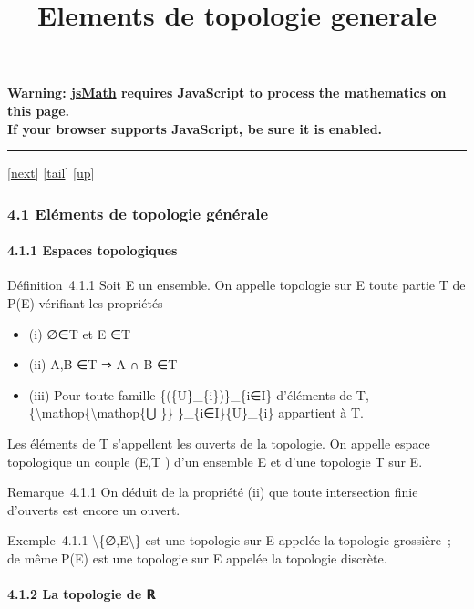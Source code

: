 \documentclass[]{article}
\title{Elements de topologie generale}
\author{}
\date{}
\begin{document}
\maketitle

\textbf{Warning: \href{http://www.math.union.edu/locate/jsMath}{jsMath}
requires JavaScript to process the mathematics on this page.\\ If your
browser supports JavaScript, be sure it is enabled.}

\begin{center}\rule{3in}{0.4pt}\end{center}

{[}\href{coursse19.html}{next}{]}
{[}\hyperref[tailcoursse18.html]{tail}{]}
{[}\href{coursch5.html\#coursse18.html}{up}{]}

\subsubsection{4.1 Eléments de topologie générale}

\paragraph{4.1.1 Espaces topologiques}

Définition~4.1.1 Soit E un ensemble. On appelle topologie sur E toute
partie T de P(E) vérifiant les propriétés

\begin{itemize}
\itemsep1pt\parskip0pt
\item
  (i) ∅∈T et E ∈T
\item
  (ii) A,B ∈T ⇒ A ∩ B ∈T
\item
  (iii) Pour toute famille \{(\{U\}\_\{i\})\}\_\{i∈I\} d'éléments de T,
  \{\textbackslash{}mathop\{\textbackslash{}mathop\{⋃ \}\}
  \}\_\{i∈I\}\{U\}\_\{i\} appartient à T.
\end{itemize}

Les éléments de T s'appellent les ouverts de la topologie. On appelle
espace topologique un couple (E,T ) d'un ensemble E et d'une topologie T
sur E.

Remarque~4.1.1 On déduit de la propriété (ii) que toute intersection
finie d'ouverts est encore un ouvert.

Exemple~4.1.1 \textbackslash{}\{∅,E\textbackslash{}\} est une topologie
sur E appelée la topologie grossière~; de même P(E) est une topologie
sur E appelée la topologie discrète.

\paragraph{4.1.2 La topologie de ℝ}
\end{document}

